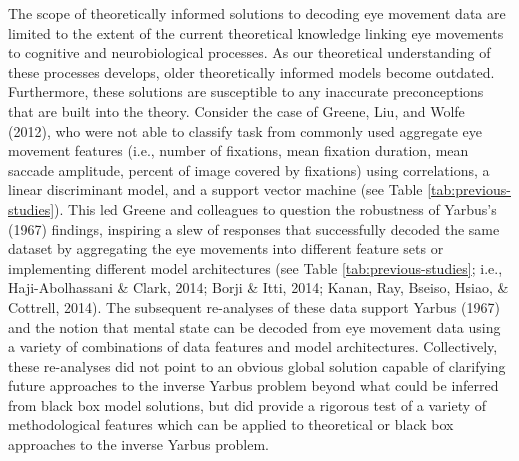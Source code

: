\documentclass[
  english,
  man,floatsintext]{apa6}
\begin{document}
The scope of theoretically informed solutions to decoding eye movement data are limited to the extent of the current theoretical knowledge linking eye movements to cognitive and neurobiological processes. As our theoretical understanding of these processes develops, older theoretically informed models become outdated. Furthermore, these solutions are susceptible to any inaccurate preconceptions that are built into the theory. Consider the case of Greene, Liu, and Wolfe (2012), who were not able to classify task from commonly used aggregate eye movement features (i.e., number of fixations, mean fixation duration, mean saccade amplitude, percent of image covered by fixations) using correlations, a linear discriminant model, and a support vector machine (see Table \ref{tab:previous-studies}). This led Greene and colleagues to question the robustness of Yarbus's (1967) findings, inspiring a slew of responses that successfully decoded the same dataset by aggregating the eye movements into different feature sets or implementing different model architectures (see Table \ref{tab:previous-studies}; i.e., Haji-Abolhassani \& Clark, 2014; Borji \& Itti, 2014; Kanan, Ray, Bseiso, Hsiao, \& Cottrell, 2014). The subsequent re-analyses of these data support Yarbus (1967) and the notion that mental state can be decoded from eye movement data using a variety of combinations of data features and model architectures. Collectively, these re-analyses did not point to an obvious global solution capable of clarifying future approaches to the inverse Yarbus problem beyond what could be inferred from black box model solutions, but did provide a rigorous test of a variety of methodological features which can be applied to theoretical or black box approaches to the inverse Yarbus problem.
\end{document}

